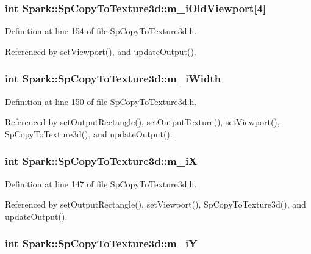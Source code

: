 \subsubsection{\setlength{\rightskip}{0pt plus 5cm}int {\bf Spark::Sp\-Copy\-To\-Texture3d::m\_\-i\-Old\-Viewport}[4]\hspace{0.3cm}{\tt  [protected]}}\label{classSpark_1_1SpCopyToTexture3d_p9}


Definition at line 154 of file Sp\-Copy\-To\-Texture3d.h.

Referenced by set\-Viewport(), and update\-Output().
\subsubsection{\setlength{\rightskip}{0pt plus 5cm}int {\bf Spark::Sp\-Copy\-To\-Texture3d::m\_\-i\-Width}\hspace{0.3cm}{\tt  [protected]}}\label{classSpark_1_1SpCopyToTexture3d_p6}


Definition at line 150 of file Sp\-Copy\-To\-Texture3d.h.

Referenced by set\-Output\-Rectangle(), set\-Output\-Texture(), set\-Viewport(), Sp\-Copy\-To\-Texture3d(), and update\-Output().
\subsubsection{\setlength{\rightskip}{0pt plus 5cm}int {\bf Spark::Sp\-Copy\-To\-Texture3d::m\_\-i\-X}\hspace{0.3cm}{\tt  [protected]}}\label{classSpark_1_1SpCopyToTexture3d_p4}


Definition at line 147 of file Sp\-Copy\-To\-Texture3d.h.

Referenced by set\-Output\-Rectangle(), set\-Viewport(), Sp\-Copy\-To\-Texture3d(), and update\-Output().
\subsubsection{\setlength{\rightskip}{0pt plus 5cm}int {\bf Spark::Sp\-Copy\-To\-Texture3d::m\_\-i\-Y}\hspace{0.3cm}{\tt  [protected]}}\label{classSpark_1_1SpCopyToTexture3d_p5}


